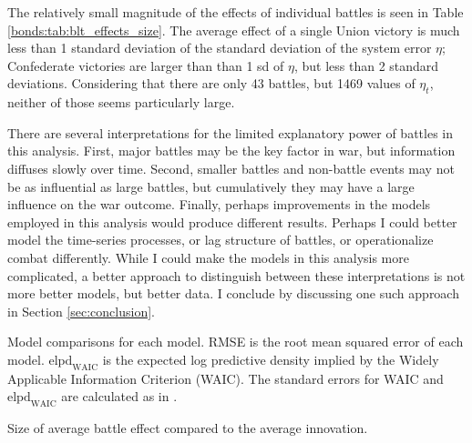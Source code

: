 The relatively small magnitude of the effects of individual battles is seen in Table \ref{bonds:tab:blt_effects_size}.
The average effect of a single Union victory is much less than 1 standard deviation of the standard deviation of the system error $\eta$; Confederate victories are larger than than 1 sd of $\eta$, but less than 2 standard deviations.
Considering that there are only 43 battles, but 1469 values of $\eta_{t}$, neither of those seems particularly large.

There are several interpretations for the limited explanatory power of battles in this analysis.
First, major battles may be the key factor in war, but information diffuses slowly over time.
Second, smaller battles and non-battle events may not be as influential as large battles, but cumulatively they may have a large influence on the war outcome.
Finally, perhaps improvements in the models employed in this analysis would produce different results.
Perhaps I could better model the time-series processes, or lag structure of battles, or operationalize combat differently.
While I could make the models in this analysis more complicated, a better approach to distinguish between these interpretations is not more better models, but better data.
I conclude by discussing one such approach in Section \ref{sec:conclusion}.

\begin{table}[!htpb]
  \centering
  
  \caption[Model comparisons for models of bond yields.]{
    Model comparisons for each model.
    RMSE is the root mean squared error of each model.
    $\text{elpd}_{\text{WAIC}}$ is the expected log predictive density implied by the Widely Applicable Information Criterion (WAIC).
    The standard errors for WAIC and $\text{elpd}_{\text{WAIC}}$ are calculated as in \textcite{GelmanVehtari2014a}.
  }
  \label{bonds:tab:waic}
\end{table}

\begin{table}[!htpb]
  \centering
  
  \caption{Size of average battle effect compared to the average innovation.}
  \label{bonds:tab:blt_effects_size}
\end{table}



